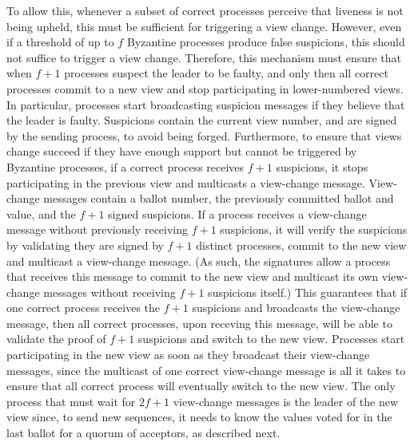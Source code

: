 To allow this, whenever a subset of correct processes perceive that liveness is not being upheld, this must be sufficient for triggering a view change. However, even if a threshold of up to $f$ Byzantine processes produce false suspicions, this should not suffice to trigger a view change. Therefore, this mechanism must ensure that when $f+1$ processes suspect the leader to be faulty, and only then all correct processes commit to a new view and stop participating in lower-numbered views. In particular, processes start broadcasting suspicion messages if they believe that the leader is faulty. Suspicions contain the current view number, and are signed by the sending process, to avoid being forged. Furthermore, to ensure that views change succeed if they have enough support but cannot be triggered by Byzantine processes, if a correct process receives $f+1$ suspicions, it stops participating in the previous view and multicasts a view-change message. View-change messages contain a ballot number, the previously committed ballot and value, and the $f+1$ signed suspicions. If a process receives a view-change message without previously receiving $f+1$ suspicions, it will verify the suspicions by validating they are signed by $f+1$ distinct processes, commit to the new view and multicast a view-change message. (As such, the signatures allow a process that receives this message to commit to the new view and multicast its own view-change messages without receiving $f+1$ suspicions itself.)  This guarantees that if one correct process receives the $f+1$ suspicions and broadcasts the view-change message, then all correct processes, upon receving this message, will be able to validate the proof of $f+1$ suspicions and switch to the new view. Processes start participating in the new view as soon as they broadcast their view-change messages, since the multicast of one correct view-change message is all it takes to ensure that all correct process will eventually switch to the new view. The only process that must wait for $2f+1$ view-change messages is the leader of the new view since, to send new sequences, it needs to know the values voted for in the last ballot for a quorum of acceptors, as described next.




